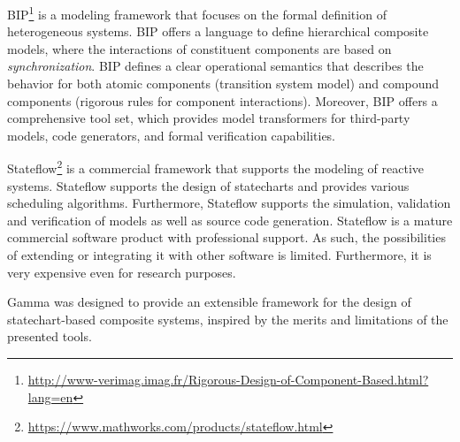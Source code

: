 BIP\footnote{\url{http://www-verimag.imag.fr/Rigorous-Design-of-Component-Based.html?lang=en}} \cite{bip,bip3} is a modeling framework that focuses on the formal definition of heterogeneous systems.
BIP offers a language to define hierarchical composite models, where the interactions of constituent components are based on \emph{synchronization}. BIP defines a clear operational semantics that describes the behavior for both atomic components (transition system model) and compound components (rigorous rules for component interactions). Moreover, BIP offers a comprehensive tool set, which provides model transformers for third-party models, code generators, and formal
verification capabilities.

Stateflow\footnote{\url{https://www.mathworks.com/products/stateflow.html}} \cite{stateflow} is a commercial framework that supports the modeling of
reactive systems. Stateflow supports the design of
statecharts and provides various scheduling
algorithms. Furthermore, Stateflow supports the simulation, validation and verification of models as well as source code generation. Stateflow is a mature commercial software product with professional
support. As such, the possibilities of extending or integrating it with other software is limited. Furthermore, it is very expensive even for research purposes.

Gamma was designed to provide an extensible framework for the design of statechart-based composite systems, inspired by the merits and limitations of the presented tools. 


